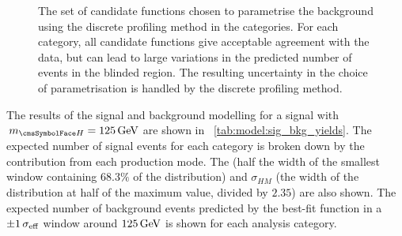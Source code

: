 \begin{figure}
\begin{center}
 \caption{The set of candidate functions chosen to parametrise the background using the discrete profiling method in the \Untagged categories. For each category, all candidate functions give acceptable agreement with the data, but can lead to large variations in the predicted number of events in the blinded region. The resulting uncertainty in the choice of parametrisation is handled by the discrete profiling method.}
 \label{fig:model_bkg_multipdf}
 \end{center}
\end{figure}


The results of the signal and background modelling for a signal with $\mH=125\GeV$ are shown in \Table~\ref{tab:model:sig_bkg_yields}. The expected number of signal events for each category is broken down by the contribution from each production mode. The \effSigma (half the width of the smallest window containing $68.3\%$ of the distribution) and $\sigma_{HM}$ (the width of the distribution at half of the maximum value, divided by $2.35$) are also shown. The expected number of background events predicted by the best-fit function in a $\pm 1 \,\sigma_{\text{eff}}$ window around $125\,\text{Ge\hspace{-.08em}V}$ is shown for each analysis category. 

